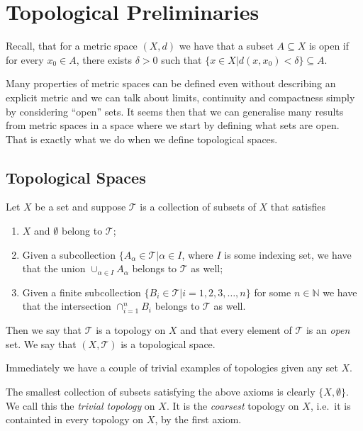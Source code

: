 \section{Topological Preliminaries}
\label{sec:prelims}

Recall, that for a metric space $(X,d)$ we have that a subset $A
\subseteq X$ is open if for every $x_0 \in A$, there exists $\delta >
0$ such that $\{x \in X | d(x,x_0) < \delta\} \subseteq A$.

Many properties of metric spaces can be defined even without
describing an explicit metric and we can talk about limits, continuity
and compactness simply by considering ``open'' sets. It seems then
that we can generalise many results from metric spaces in a space
where we start by defining what sets are open. That is exactly what we
do when we define topological spaces.

\subsection{Topological Spaces}
\label{sec:prelims:topospace}

\begin{defn}
  Let $X$ be a set and suppose $\mathscr{T}$ is a collection of
  subsets of $X$ that satisfies
  \begin{enumerate}
  \item $X$ and $\emptyset$ belong to $\mathscr{T}$;
  \item Given a subcollection $\{A_\alpha \in \mathscr{T} | \alpha \in
    I$, where $I$ is some indexing set, we have that the union
    $\cup_{\alpha \in I}A_\alpha$ belongs to $\mathscr{T}$ as well;
  \item Given a finite subcollection $\{B_i \in \mathscr{T} | i =
    1,2,3,\dots, n \}$ for some $n \in \mathbb{N}$ we have that the
    intersection $\cap_{i = 1}^{n} B_i$ belongs to $\mathscr{T}$ as well.
  \end{enumerate}
  Then we say that $\mathscr{T}$ is a topology on $X$ and that every
  element of $\mathscr{T}$ is an \emph{open} set. We say that
  $(X,\mathscr{T})$ is a topological space.
\end{defn}

Immediately we have a couple of trivial examples of topologies given
any set $X$.

\begin{exmp}
  \label{exmp:trivial}
  The smallest collection of subsets satisfying the above axioms is
  clearly $\{ X, \emptyset \}$. We call this the \emph{trivial
    topology} on $X$. It is the \emph{coarsest} topology on $X$, i.e.\
  it is containted in every topology on $X$, by the first axiom.
\end{exmp}

